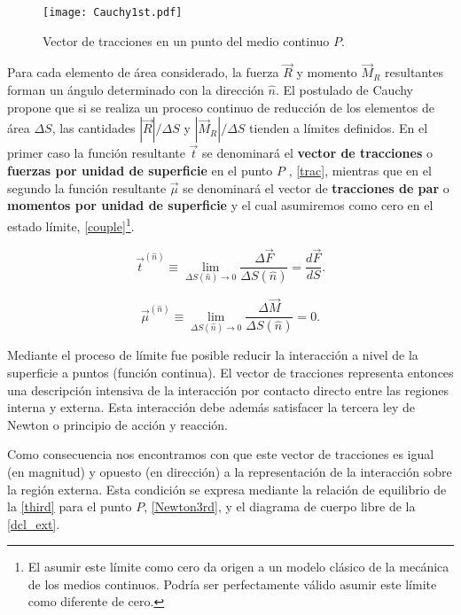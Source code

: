 \documentclass[../notas medios.tex]{subfiles}
\begin{document}
\begin{figure}[H]
\centering
	\texttt{[image: Cauchy1st.pdf]}
	\caption{Vector de tracciones en un punto del medio continuo $P$.}
	\label{Cauchy1st}
\end{figure}

Para cada elemento de área considerado, la fuerza $\vec R$ y momento ${\vec
M_R}$ resultantes forman un ángulo determinado con la dirección $\hat{n}$. El
postulado de Cauchy propone que si se realiza un proceso continuo de reducción
de los elementos de área $\Delta S$, las cantidades $\left| {\vec R}
\right|/\Delta S$ y $\left| {{{\vec M}_R}} \right|/\Delta S$   tienden a límites
definidos. En el primer caso la función resultante $\vec t$ se denominará el
{\bf vector de tracciones} o {\bf fuerzas por unidad de superficie} en el punto
$P$ , \cref{trac}, mientras que en el segundo la función resultante $\vec \mu $
se denominará el vector de {\bf tracciones de par} o {\bf momentos por unidad de
superficie} y el cual asumiremos como cero en el estado límite,
\cref{couple}\footnote{El asumir este límite como cero da origen a un modelo
clásico de la mecánica de los medios continuos. Podría ser perfectamente válido
asumir este límite como diferente de cero.}.

\begin{equation}
{\vec t^{(\hat n)}} \equiv \mathop {\lim }\limits_{\Delta S(\hat n) \to 0} \frac{{\Delta \vec F}}{{\Delta S(\hat n)}} = \frac{{d\vec F}}{{dS}}.
\label{trac}
\end{equation}

\begin{equation}
{\vec \mu ^{(\hat n)}} \equiv \mathop {\lim }\limits_{\Delta S(\hat n) \to 0} \frac{{\Delta \vec M}}{{\Delta S(\hat n)}} = 0.
\label{couple}
\end{equation}


Mediante el proceso de límite fue posible reducir la interacción a nivel de la
superficie a puntos (función continua). El vector de tracciones representa
entonces una descripción intensiva de la interacción por contacto directo entre
las regiones interna y externa. Esta interacción debe además satisfacer la
tercera ley de Newton o principio de acción y reacción.

Como consecuencia nos encontramos con que este vector de tracciones es igual (en
magnitud) y opuesto (en dirección) a la representación de la interacción sobre
la región externa. Esta condición se expresa mediante la relación de equilibrio
de la \cref{third} para el punto $P$, \cref{Newton3rd}, y el diagrama de cuerpo
libre de la \cref{dcl_ext}.
\end{document}

